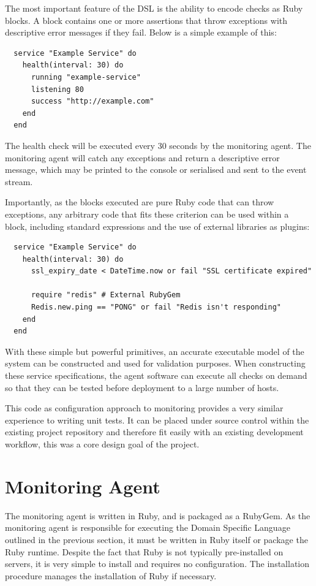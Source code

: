 \documentclass{cshonours}
\begin{document}
The most important feature of the DSL is the ability to encode checks as Ruby blocks. A block contains one or more assertions that throw exceptions with descriptive error messages if they fail. Below is a simple example of this:

\begin{verbatim}
  service "Example Service" do
    health(interval: 30) do
      running "example-service"
      listening 80
      success "http://example.com"
    end
  end
\end{verbatim}

The health check will be executed every 30 seconds by the monitoring agent. The monitoring agent will catch any exceptions and return a descriptive error message, which may be printed to the console or serialised and sent to the event stream.

Importantly, as the blocks executed are pure Ruby code that can throw exceptions, any arbitrary code that fits these criterion can be used within a block, including standard expressions and the use of external libraries as plugins:

\begin{verbatim}
  service "Example Service" do
    health(interval: 30) do
      ssl_expiry_date < DateTime.now or fail "SSL certificate expired"

      require "redis" # External RubyGem
      Redis.new.ping == "PONG" or fail "Redis isn't responding"
    end
  end
\end{verbatim}

With these simple but powerful primitives, an accurate executable model of the system can be constructed and used for validation purposes. When constructing these service specifications, the agent software can execute all checks on demand so that they can be tested before deployment to a large number of hosts.

This code as configuration approach to monitoring provides a very similar experience to writing unit tests. It can be placed under source control within the existing project repository and therefore fit easily with an existing development workflow, this was a core design goal of the project.

\pagebreak
\section{Monitoring Agent}

The monitoring agent is written in Ruby, and is packaged as a RubyGem. As the monitoring agent is responsible for executing the Domain Specific Language outlined in the previous section, it must be written in Ruby itself or package the Ruby runtime. Despite the fact that Ruby is not typically pre-installed on servers, it is very simple to install and requires no configuration. The installation procedure manages the installation of Ruby if necessary.
\end{document}
